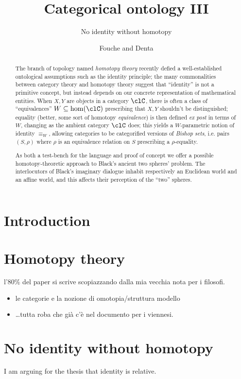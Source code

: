 \documentclass{amsart}
\author{Fouche and Denta}
\title{Categorical ontology III}
\subtitle{No identity without homotopy}
\begin{document}
\maketitle
\begin{abstract}
  The branch of topology named \emph{homotopy theory} recently defied a well\hyp{}established ontological assumptions such as the identity principle; the many commonalities between category theory and homotopy theory suggest that ``identity'' is not a primitive concept, but instead depends on our concrete representation of mathematical entities. When $X,Y$ are objects in a category $\clC$, there is often a class of ``equivalences'' $W \subseteq \hom(\clC)$ prescribing that $X,Y$ shouldn't be distinguished; equality (better, some sort of homotopy \emph{equivalence}) is then defined \emph{ex post} in terms of $W$, changing as the ambient category $\clC$ does; this yields a $W$-parametric notion of identity $\equiv_W$, allowing categories to be categorified versions of \emph{Bishop sets}, i.e. pairs $(S,\rho)$ where $\rho$ is an equivalence relation on $S$ prescribing a $\rho$-equality.

  As both a test-bench for the language and proof of concept we offer a possible homotopy-theoretic approach to Black's ancient two spheres' problem. The interlocutors of Black's imaginary dialogue inhabit respectively an Euclidean world and an affine world, and this affects their perception of the ``two'' spheres.
\end{abstract}
\section{Introduction}
\section{Homotopy theory}
l'80\% del paper si scrive scopiazzando dalla mia vecchia nota per i filosofi.
\begin{itemize}
  \item le categorie e la nozione di omotopia/struttura modello
  \item \dots tutta roba che già c'è nel documento per i viennesi.
\end{itemize}
\section{No identity without homotopy}
\epigraph{I am arguing for the thesis that identity is relative.}{\cite{}}
\end{document}
